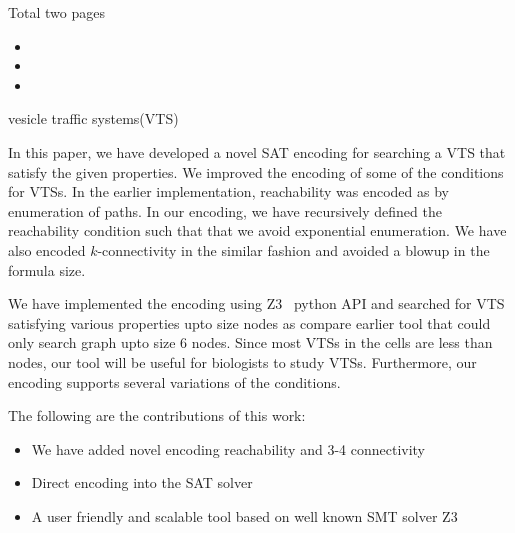 Total two pages

\begin{itemize}
\item {}

\item {}

\item {}

\end{itemize}




vesicle traffic systems(VTS)





%

In this paper, we have developed a novel SAT encoding for
searching a VTS that satisfy the given properties.
%
We improved the encoding of some of the conditions for VTSs.
%
In the earlier implementation, reachability was encoded as
by enumeration of paths.
%
In our encoding, we have recursively defined the reachability condition
such that that we avoid exponential enumeration.
%
We have also encoded $k$-connectivity in the similar fashion and
avoided a blowup in the formula size.
%

We have implemented the encoding using Z3~\cite{z3} python API and searched for
VTS satisfying various properties upto size  nodes as compare
earlier tool that could only search graph upto size 6 nodes.
%
Since most VTSs in the cells are less than  nodes,
our tool will be useful for biologists to study VTSs.
%
Furthermore, our encoding supports several variations of
the conditions.


The following are the contributions of this work:
\begin{itemize}
\item We have added novel encoding reachability and 3-4 connectivity
\item Direct encoding into the SAT solver
\item A user friendly and scalable tool based on well known SMT solver Z3
\end{itemize}


